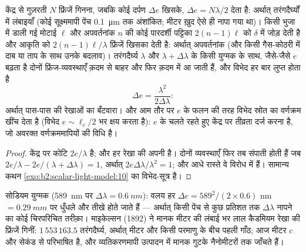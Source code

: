 \begin{proposition}[लंबाइयाँ, अपवर्तनांक, वर्णक्रम]\label{prop:b2:michelson:measure}
केंद्र से गुज़रती $N$ फ्रिंजें गिनना, जबकि कोई दर्पण $\Delta e$ खिसके,
$\Delta e = N\lambda/2$ देता है: अर्थात् तरंगदैर्घ्यों में लंबाइयाँ (कोई सूक्ष्ममापी पेंच
\qty{0.1}{\micro m} तक अंशांकित; मीटर ख़ुद ऐसे ही नापा गया था)। किसी
भुजा में डाली गई मोटाई $\ell$ और अपवर्तनांक $n$ की कोई पारदर्शी पट्टिका
$2(n - 1)\ell$ को $\delta$ में जोड़ देती है और आकृति को $2(n - 1)\ell/\lambda$
फ्रिंजें खिसका देती है: अर्थात् अपवर्तनांक (और किसी गैस-कोठरी में दाब या ताप के
साथ उनके बदलाव)। तरंगदैर्घ्य $\lambda$ और $\lambda + \Delta\lambda$ के किसी युग्मक के साथ, जैसे-जैसे $e$ बढ़ता है
दोनों फ्रिंज-व्यवस्थाएँ क़दम से बाहर और फिर क़दम में आ जाती हैं, और
विभेद हर बार लुप्त होता है
\[
\Delta e = \frac{\lambda^2}{2\Delta\lambda} :
\]
अर्थात् पास-पास की रेखाओं का बँटवारा। और आम तौर पर $e$ के फलन की तरह
विभेद स्रोत का वर्णक्रम खींच देता है (विभेद
$e \sim \ell_c/2$ भर क्षय करता है): $e$ के चलते रहते हुए केंद्र पर तीव्रता दर्ज करना
\emph{} है, जो अवरक्त वर्णक्रममापियों की विधि है।
\end{proposition}

\begin{proof}
केंद्र पर कोटि $2e/\lambda$ है; और हर रेखा की अपनी है। दोनों
व्यवस्थाएँ फिर तब संपाती होती हैं जब $2e/\lambda - 2e/(\lambda + \Delta\lambda) = 1$, अर्थात् $2e\Delta\lambda
/\lambda^2 = 1$; और आधे रास्ते वे विरोध में हैं। सामान्य कथन
\cref{exo:b2:scalar-light-model:10} का विभेद-सूत्र है।
\end{proof}

\begin{example}[सोडियम, और मीटर]\label{ex:b2:michelson:sodium}
सोडियम युग्मक (\qty{589}{nm} पर $\Delta\lambda = \qty{0.6}{nm}$): वलय हर
$\Delta e = 589^2/(2 \times 0.6)$ nm $= \qty{0.29}{mm}$ पर धुँधले और तीखे होते जाते हैं --- अर्थात्
किसी पेंच से कुछ प्रतिशत तक $\Delta\lambda$ नापने का कोई चिरपरिचित तरीक़ा। माइकेल्सन (1892) ने
मानक मीटर की लंबाई भर लाल कैडमियम रेखा की फ्रिंजें गिनीं:
$1\,553\,163.5$ तरंगदैर्घ्य, अर्थात् मीटर और किसी परमाणु के बीच पहली गाँठ;
आज मीटर $c$ और सेकंड से परिभाषित है, और
व्यतिकरणमापी उत्पादन में मानक गुटके नैनोमीटरों तक जाँचते हैं।
\end{example}

